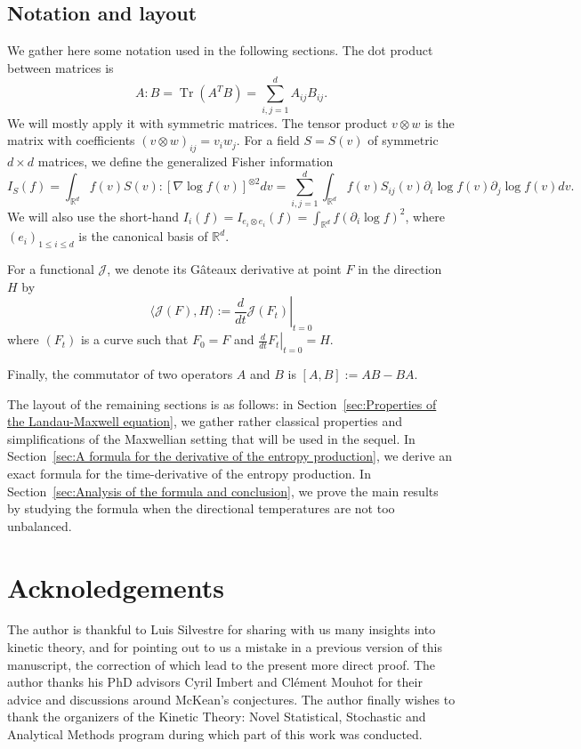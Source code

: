 \documentclass[11pt,a4paper]{article}
\theoremstyle{definition}
\theoremstyle{plain}
\DeclareMathOperator*{\Tr}{Tr}
\begin{document}
\subsection{Notation and layout}
We gather here some notation used in the following sections. The dot product between matrices is
 $$A:B = \Tr(A^TB)=\sum_{ i,j=1}^d A_{ij} B_{ij}.$$
We will mostly apply it with symmetric matrices. The tensor product $v\otimes w$ is the matrix with coefficients $(v\otimes w)_{ij}=v_iw_j$. For a field $S=S(v)$ of symmetric $d\times d$ matrices, we define the generalized Fisher information
\begin{equation}
\label{eq:defI_S}
    I_S (f)=\int_{\mathbb{R}^{d}} f(v) S(v):\left[ \nabla\log f(v)\right]^{\otimes 2}dv = \sum_{i,j=1}^d \int_{\mathbb{R}^{d}} f(v) S_{ij}(v) \partial_i\log f(v) \partial_j\log f(v)dv.
\end{equation}
We will also use the short-hand
$I_i(f) = I_{e_i\otimes e_i}(f)=\int_{\mathbb{R}^{d}} f(\partial_i \log f)^2$,
where $(e_i)_{1\leq i \leq d}$ is the canonical basis of $\mathbb{R}^d$.

For a functional $\mathcal{J}$, we denote its Gâteaux derivative at point $F$ in the direction $H$ by
$$\langle \mathcal{J}(F),H \rangle:=\left.\frac{d}{dt}\mathcal{J}(F_t)\right\vert_{t=0}$$
where $(F_t)$ is a curve such that $F_0=F$ and $\left.\frac{d}{dt}F_t\right\vert_{t=0}=H$.

Finally, the commutator of two operators $A$ and $B$ is $[A,B]:=AB-BA$.

The layout of the remaining sections is as follows: in Section~\ref{sec:Properties of the Landau-Maxwell equation}, we gather rather classical properties and simplifications of the Maxwellian setting that will be used in the sequel. In Section~\ref{sec:A formula for the derivative of the entropy production}, we derive an exact formula for the time-derivative of the entropy production. In Section~\ref{sec:Analysis of the formula and conclusion}, we prove the main results by studying the formula when the directional temperatures are not too unbalanced.



\section*{Acknoledgements}

The author is thankful to Luis Silvestre for sharing with us many insights into kinetic theory, and for pointing out to us a mistake in a previous version of this manuscript, the correction of which lead to the present more direct proof. The author thanks his PhD advisors Cyril Imbert and Clément Mouhot for their advice and discussions around McKean's conjectures. The author finally wishes to thank the organizers of the Kinetic Theory: Novel Statistical, Stochastic and Analytical Methods program during which part of this work was conducted.
\end{document}
